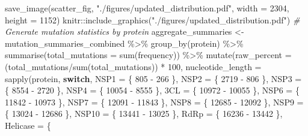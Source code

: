 \documentclass{article}
\newenvironment{Shaded}{\begin{snugshade}}{\end{snugshade}}
\newcommand{\AttributeTok}[1]{\textcolor[rgb]{0.77,0.63,0.00}{#1}}
\newcommand{\CommentTok}[1]{\textcolor[rgb]{0.56,0.35,0.01}{\textit{#1}}}
\newcommand{\ControlFlowTok}[1]{\textcolor[rgb]{0.13,0.29,0.53}{\textbf{#1}}}
\newcommand{\DecValTok}[1]{\textcolor[rgb]{0.00,0.00,0.81}{#1}}
\newcommand{\FunctionTok}[1]{\textcolor[rgb]{0.00,0.00,0.00}{#1}}
\newcommand{\NormalTok}[1]{#1}
\newcommand{\OtherTok}[1]{\textcolor[rgb]{0.56,0.35,0.01}{#1}}
\newcommand{\SpecialCharTok}[1]{\textcolor[rgb]{0.00,0.00,0.00}{#1}}
\newcommand{\StringTok}[1]{\textcolor[rgb]{0.31,0.60,0.02}{#1}}
\begin{document}
\begin{Shaded}
\begin{Highlighting}[]
\FunctionTok{save\_image}\NormalTok{(scatter\_fig, }\StringTok{"./figures/updated\_distribution.pdf"}\NormalTok{, }\AttributeTok{width =} \DecValTok{2304}\NormalTok{, }\AttributeTok{height =} \DecValTok{1152}\NormalTok{)}
\NormalTok{knitr}\SpecialCharTok{::}\FunctionTok{include\_graphics}\NormalTok{(}\StringTok{"./figures/updated\_distribution.pdf"}\NormalTok{)}
\CommentTok{\# Generate mutation statistics by protein}
\NormalTok{aggregate\_summaries }\OtherTok{\textless{}{-}}\NormalTok{ mutation\_summaries\_combined }\SpecialCharTok{\%\textgreater{}\%}
    \FunctionTok{group\_by}\NormalTok{(protein) }\SpecialCharTok{\%\textgreater{}\%}
    \FunctionTok{summarise}\NormalTok{(}\AttributeTok{total\_mutations =} \FunctionTok{sum}\NormalTok{(frequency)) }\SpecialCharTok{\%\textgreater{}\%}
    \FunctionTok{mutate}\NormalTok{(}\AttributeTok{raw\_percent =}\NormalTok{ (total\_mutations}\SpecialCharTok{/}\FunctionTok{sum}\NormalTok{(total\_mutations)) }\SpecialCharTok{*} \DecValTok{100}\NormalTok{, }\AttributeTok{nucleotide\_length =} \FunctionTok{sapply}\NormalTok{(protein,}
        \ControlFlowTok{switch}\NormalTok{, }\AttributeTok{NSP1 =}\NormalTok{ \{}
            \DecValTok{805} \SpecialCharTok{{-}} \DecValTok{266}
\NormalTok{        \}, }\AttributeTok{NSP2 =}\NormalTok{ \{}
            \DecValTok{2719} \SpecialCharTok{{-}} \DecValTok{806}
\NormalTok{        \}, }\AttributeTok{NSP3 =}\NormalTok{ \{}
            \DecValTok{8554} \SpecialCharTok{{-}} \DecValTok{2720}
\NormalTok{        \}, }\AttributeTok{NSP4 =}\NormalTok{ \{}
            \DecValTok{10054} \SpecialCharTok{{-}} \DecValTok{8555}
\NormalTok{        \}, }\StringTok{\textasciigrave{}}\AttributeTok{3CL}\StringTok{\textasciigrave{}} \OtherTok{=}\NormalTok{ \{}
            \DecValTok{10972} \SpecialCharTok{{-}} \DecValTok{10055}
\NormalTok{        \}, }\AttributeTok{NSP6 =}\NormalTok{ \{}
            \DecValTok{11842} \SpecialCharTok{{-}} \DecValTok{10973}
\NormalTok{        \}, }\AttributeTok{NSP7 =}\NormalTok{ \{}
            \DecValTok{12091} \SpecialCharTok{{-}} \DecValTok{11843}
\NormalTok{        \}, }\AttributeTok{NSP8 =}\NormalTok{ \{}
            \DecValTok{12685} \SpecialCharTok{{-}} \DecValTok{12092}
\NormalTok{        \}, }\AttributeTok{NSP9 =}\NormalTok{ \{}
            \DecValTok{13024} \SpecialCharTok{{-}} \DecValTok{12686}
\NormalTok{        \}, }\AttributeTok{NSP10 =}\NormalTok{ \{}
            \DecValTok{13441} \SpecialCharTok{{-}} \DecValTok{13025}
\NormalTok{        \}, }\AttributeTok{RdRp =}\NormalTok{ \{}
            \DecValTok{16236} \SpecialCharTok{{-}} \DecValTok{13442}
\NormalTok{        \}, }\AttributeTok{Helicase =}\NormalTok{ \{}

\end{Highlighting}
\end{Shaded}
\end{document}
